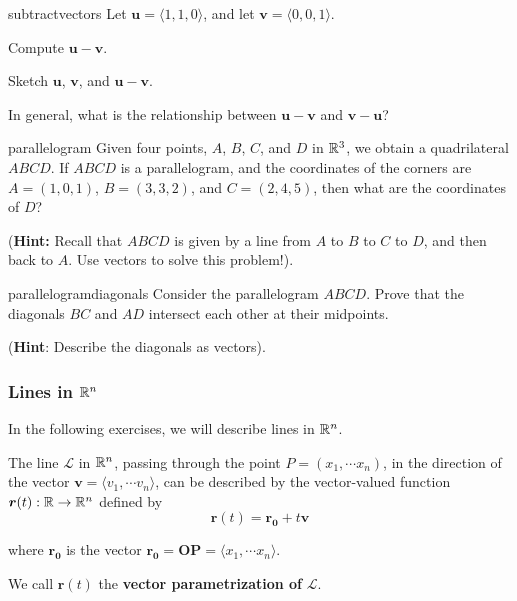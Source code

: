 \begin{problem}{subtractvectors}
    Let $\bm{u} = \langle 1, 1, 0 \rangle$, and let $\bm{v} = \langle 0, 0, 1 \rangle$. 
    
    \begin{subproblems}
    \item Compute $\bm{u-v}$.
    \item Sketch $\bm{u}$, $\bm{v}$, and $\bm{u-v}$.
    \item In general, what is the relationship between  $\bm{u-v}$ and  $\bm{v-u}$?
    \end{subproblems}
\end{problem}

\begin{problem}{parallelogram}
    Given four points, $A$, $B$, $C$, and $D$ in $\mathbb{R}^3$, we obtain a quadrilateral $ABCD$.  If $ABCD$ is a parallelogram, and the coordinates of the corners are $A = (1,0,1)$, $B = (3,3,2)$, and $C = (2,4, 5)$, then what are the coordinates of $D$?
    
    (\textbf{Hint:} Recall that $ABCD$ is given by a line from $A$ to $B$ to $C$ to $D$, and then back to $A$.  Use vectors to solve this problem!).
\end{problem}

\begin{problem}{parallelogramdiagonals}
    Consider the parallelogram $ABCD$.  Prove that the diagonals $BC$ and $AD$ intersect each other at their midpoints.
    
    (\textbf{Hint}: Describe the diagonals as vectors).
\end{problem}


\subsubsection{Lines in $\mathbb{R}^n$}

In the following exercises, we will describe lines in $\mathbb{R}^n$.
    
    \begin{definition}\label{linesinrn}
    The line $\mathscr{L}$ in $\mathbb{R}^n$, passing through the point $P = (x_1, \cdots x_n)$, in the direction of the vector $\bm{v} = \langle v_1,  \cdots v_n \rangle$, can be described by the vector-valued function $\bm{r}(t) : \mathbb{R} \to \mathbb{R}^n$ defined by $$\bm{r}(t) = \bm{r_0} + t\bm{v}$$
    
    where $\bm{r_0}$ is the vector $\bm{r_0} = \bm{OP} = \langle x_1, \cdots x_n\rangle$.
    
    We call $\bm{r}(t)$ the \textbf{vector parametrization of} $\mathscr{L}$.
    
    \end{definition}

